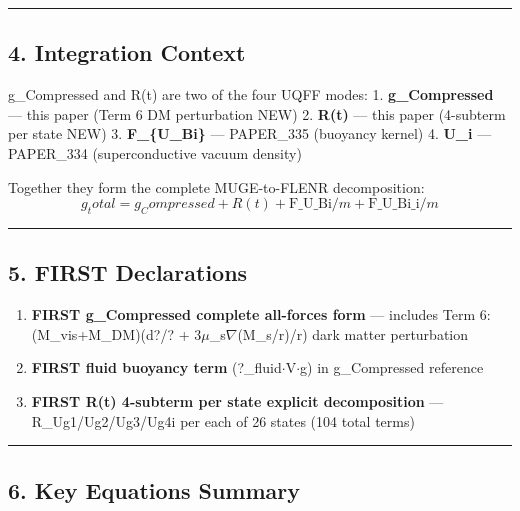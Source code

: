 \begin{center}\rule{0.5\linewidth}{0.5pt}\end{center}

\subsection{4. Integration Context}\label{integration-context}

g\_Compressed and R(t) are two of the four UQFF modes: 1.
\textbf{g\_Compressed} --- this paper (Term 6 DM perturbation NEW) 2.
\textbf{R(t)} --- this paper (4-subterm per state NEW) 3.
\textbf{F\_\{U\_Bi\}} --- PAPER\_335 (buoyancy kernel) 4. \textbf{U\_i}
--- PAPER\_334 (superconductive vacuum density)

Together they form the complete MUGE-to-FLENR decomposition: \[
g_total = g_Compressed + R(t) + \text{F\_U\_Bi}/m + \text{F\_U\_Bi\_i}/m
\]

\begin{center}\rule{0.5\linewidth}{0.5pt}\end{center}

\subsection{5. FIRST Declarations}\label{first-declarations}

\begin{enumerate}
\def\labelenumi{\arabic{enumi}.}
\tightlist
\item
  \textbf{FIRST g\_Compressed complete all-forces form} --- includes
  Term 6: (M\_vis+M\_DM)(d?/? + 3\(\mu\)\_s\(\nabla\)(M\_s/r)/r) dark
  matter perturbation
\item
  \textbf{FIRST fluid buoyancy term} (?\_fluid\(\cdot\)V\(\cdot\)g) in
  g\_Compressed reference
\item
  \textbf{FIRST R(t) 4-subterm per state explicit decomposition} ---
  R\_Ug1/Ug2/Ug3/Ug4i per each of 26 states (104 total terms)
\end{enumerate}

\begin{center}\rule{0.5\linewidth}{0.5pt}\end{center}

\subsection{6. Key Equations Summary}\label{key-equations-summary}


